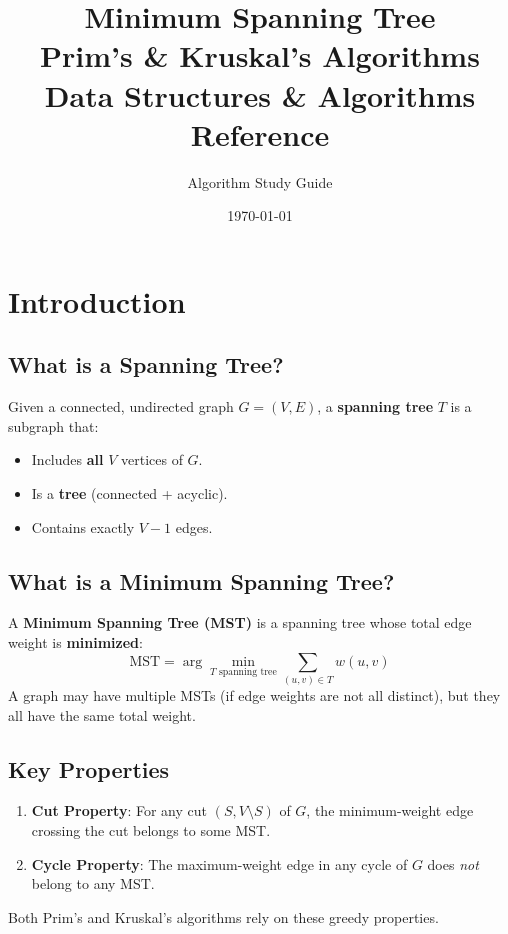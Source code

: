 \documentclass[12pt,a4paper]{article}
\title{
    \Huge \textbf{Minimum Spanning Tree} \\[0.5em]
    \Large Prim's \& Kruskal's Algorithms \\[0.5em]
    \large Data Structures \& Algorithms Reference
}
\author{Algorithm Study Guide}
\date{\today}
\begin{document}
\maketitle
\tableofcontents
\newpage

\section{Introduction}

\subsection{What is a Spanning Tree?}
Given a connected, undirected graph $G = (V, E)$, a \textbf{spanning tree} $T$ is a subgraph that:
\begin{itemize}
    \item Includes \textbf{all} $V$ vertices of $G$.
    \item Is a \textbf{tree} (connected + acyclic).
    \item Contains exactly $V - 1$ edges.
\end{itemize}

\subsection{What is a Minimum Spanning Tree?}
A \textbf{Minimum Spanning Tree (MST)} is a spanning tree whose total edge weight is \textbf{minimized}:
\[
\text{MST} = \arg\min_{T \text{ spanning tree}} \sum_{(u,v) \in T} w(u,v)
\]
A graph may have multiple MSTs (if edge weights are not all distinct), but they all have the same total weight.

\subsection{Key Properties}
\begin{enumerate}
    \item \textbf{Cut Property}: For any cut $(S, V \setminus S)$ of $G$, the minimum-weight edge crossing the cut belongs to some MST.
    \item \textbf{Cycle Property}: The maximum-weight edge in any cycle of $G$ does \textit{not} belong to any MST.
\end{enumerate}
Both Prim's and Kruskal's algorithms rely on these greedy properties.
\end{document}
